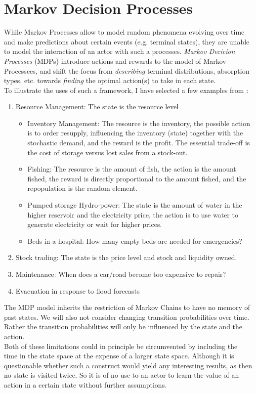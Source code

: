 \chapter{Markov Decision Processes}
While Markov Processes allow to model random phenomena evolving over time and make predictions about certain events (e.g. terminal states), they are unable to model the interaction of an actor with such a processes. \emph{Markov Decicion Processes} (MDPs) introduce actions and rewards to the model of Markov Processces, and shift the focus from \emph{describing} terminal distributions, absorption types, etc. towards \emph{finding} the optimal action(s) to take in each state.\\
To illustrate the uses of such a framework, I have selected a few examples from \textcite{whiteRealApplicationsMarkov1985}:
\begin{enumerate}
	\item Resource Management: The state is the resource level
	\begin{itemize}
		\item Inventory Management: The resource is the inventory, the possible action is to order resupply, influencing the inventory (state) together with the stochastic demand, and the reward is the profit. The essential trade-off is the cost of storage versus lost sales from a stock-out.
		\item Fishing: The resource is the amount of fish, the action is the amount fished, the reward is directly proportional to the amount fished, and the repopulation is the random element.
		\item Pumped storage Hydro-power: The state is the amount of water in the higher reservoir and the electricity price, the action is to use water to generate electricity or wait for higher prices.
		\item Beds in a hospital: How many empty beds are needed for emergencies?
	\end{itemize}
	\item Stock trading: The state is the price level and stock and liquidity owned.
	\item Maintenance: When does a car/road become too expensive to repair?
	\item Evacuation in response to flood forecasts
\end{enumerate}
The MDP model inherits the restriction of Markov Chains to have no memory of past states. We will also not consider changing transition probabilities over time. Rather the transition probabilities will only be influenced by the state and the action. \\
Both of these limitations could in principle be circumvented by including the time in the state space at the expense of a larger state space. Although it is questionable whether such a construct would yield any interesting results, as then no state is visited twice. So it is of no use to an actor to learn the value of an action in a certain state without further assumptions.


